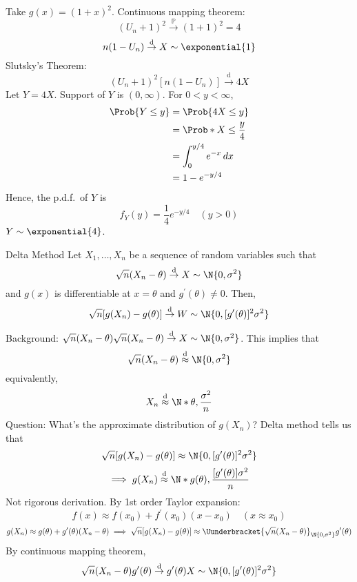 \begin{Example}{}{}
\begin{enumerate}[label=(\roman*)]
              Take $ g(x)=(1+x)^2 $. Continuous mapping theorem:
              \[ (U_n+1)^2\stackrel{\mathbb{P}}{\to}(1+1)^2=4 \]
              \[ n(1-U_n)\stackrel{\text{d}}{\to}X \sim \exponential{1} \]
              Slutsky's Theorem:
              \[ (U_n+1)^2[n(1-U_n)]\stackrel{\text{d}}{\to}4X \]
              Let $ Y=4X $. Support of $ Y $ is $ (0,\infty) $.
              For $ 0<y<\infty $,
              \begin{align*}
                  \Prob{Y\le y}
                   & =\Prob{4X\le y}               \\
                   & =\Prob*{X\le \frac{y}{4}}     \\
                   & =\int_{0}^{y/4}e^{-x} \, d{x} \\
                   & =1-e^{-y/4}
              \end{align*}
              Hence, the p.d.f.\ of $ Y $ is
              \[ f_Y(y)=\frac{1}{4} e^{-y/4}\quad (y>0) \]
              $ Y \sim \exponential{4} $.
    \end{enumerate}
\end{Example}
\begin{Theorem}{Delta Method}{}
    Let $ X_1,\ldots,X_n $ be a sequence of random variables
    such that
    \[ \sqrt{n}(X_n-\theta)
        \stackrel{\text{d}}{\to}X \sim \N{0,\sigma^2} \]
    and $ g(x) $ is differentiable at $ x=\theta $
    and $ g^{\prime}(\theta)\ne 0 $. Then,
    \[ \sqrt{n}[g(X_n)-g(\theta)]\stackrel{\text{d}}{\to}W \sim \N{0,
            [g^{\prime}(\theta)]^2\sigma^2} \]
\end{Theorem}
Background: $ \sqrt{n}(X_n-\theta)\sqrt{n}(X_n-\theta)
    \stackrel{\text{d}}{\to}X \sim \N{0,\sigma^2} $.
This implies that
\[ \sqrt{n}(X_n-\theta)\stackrel{\text{d}}{\approx}
    \N{0,\sigma^2} \]
equivalently,
\[ X_n\stackrel{\text{d}}{\approx}\N*{\theta,\frac{\sigma^2}{n}} \]
Question: What's the approximate distribution of $ g(X_n) $?
Delta method tells us that
\[ \sqrt{n}[g(X_n)-g(\theta)] \approx\N{0,
        [g^{\prime}(\theta)]^2\sigma^2} \]
\[ \implies g(X_n)\stackrel{\text{d}}{\approx}
    \N*{g(\theta),\frac{[g^\prime(\theta)]\sigma^2}{n} } \]
Not rigorous derivation. By 1st order Taylor
expansion:
\[ f(x)\approx f(x_0)+f^\prime(x_0)(x-x_0)\quad (x\approx x_0) \]
\[ g(X_n)\approx g(\theta)+g^\prime(\theta)(X_n-\theta)\implies
    \sqrt{n}[g(X_n)-g(\theta)]\approx
    \Uunderbracket{\sqrt{n}(X_n-\theta)}_{\N{0,\sigma^2}}
    g^\prime (\theta) \]
By continuous mapping theorem,
\[ \sqrt{n}(X_n-\theta)g^\prime(\theta)
    \stackrel{\text{d}}{\to} g^\prime(\theta)X \sim \N{
        0,[g^\prime(\theta)]^2\sigma^2
    } \]
